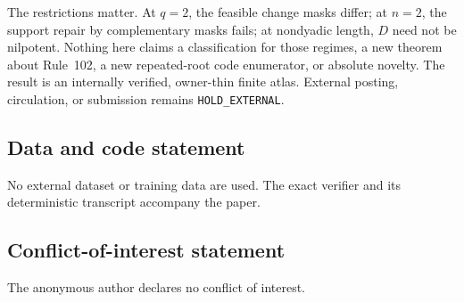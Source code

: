 \documentclass[a4paper,10pt]{amsart}
\theoremstyle{remark}
\begin{document}
The restrictions matter.  At $q=2$, the feasible change masks differ; at
$n=2$, the support repair by complementary masks fails; at nondyadic length,
$D$ need not be nilpotent.  Nothing here claims a classification for those
regimes, a new theorem about Rule~102, a new repeated-root code enumerator,
or absolute novelty.  The result is an internally verified, owner-thin
finite atlas.  External posting, circulation, or submission remains
\texttt{HOLD\_EXTERNAL}.

\subsection*{Data and code statement}
No external dataset or training data are used.  The exact verifier and its
deterministic transcript accompany the paper.

\subsection*{Conflict-of-interest statement}
The anonymous author declares no conflict of interest.



\end{document}
